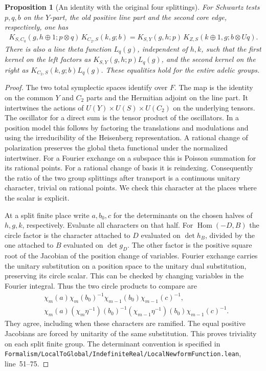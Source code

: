 \documentclass[a4paper,11pt]{article}
\newtheorem{proposition}{Proposition}[section]
\theoremstyle{definition}
\theoremstyle{remark}
\newcommand{\srcloc}[2]{{\small\nolinkurl{#1.lean}}, line~#2}
\numberwithin{equation}{section}
\begin{document}
\begin{proposition}[An identity with the original four splittings]\leavevmode
\label{prop:cancelsquare256}
For Schwartz tests \(p,q,b\) on the \(Y\)-part, the old positive
line part and the second core edge, respectively, one has
\[
\begin{split}
 K_{S,C_0}(g,h\oplus1;p\otimes q)\,K_{C_2,S}(k,g;b)
  =K_{S,Y}(g,h;p)\,K_{Z,S}(k\oplus1,g;b\otimes Uq).
\end{split}
\]
There is also a line theta function \(L_q(g)\), independent of
\(h,k\), such that the first kernel on the left factors as
\(K_{S,Y}(g,h;p)L_q(g)\), and the second kernel on the right
as \(K_{C_2,S}(k,g;b)L_q(g)\). These equalities hold for the
entire adelic groups.
\end{proposition}
\begin{proof}
The two total symplectic spaces identify over \(F\). The map is
the identity on the common \(Y\) and \(C_2\) parts and the
Hermitian adjoint on the line part. It intertwines the actions
of \(U(Y)\times U(S)\times U(C_2)\) on the underlying tensors.
The oscillator for a direct sum is the tensor product of the
oscillators. In a position model this follows by factoring the
translations and modulations and using the irreducibility of the
Heisenberg representation. A rational change of polarization
preserves the global theta functional under the normalized
intertwiner. For a Fourier exchange on a subspace this is
Poisson summation for its rational points. For a rational
change of basis it is reindexing. Consequently the ratio of
the two group splittings after transport is a continuous
unitary character, trivial on rational points. We check this
character at the places where the scalar is explicit.

At a split finite place write \(a,b_0,c\) for the determinants
on the chosen halves of \(h,g,k\), respectively. Evaluate all
characters on that half. For \(\operatorname{Hom}(-D,B)\)
the circle factor is the character attached to \(D\) evaluated
on \(\det h_B\), divided by the one attached to \(B\) evaluated
on \(\det g_D\). The other factor is the positive square root
of the Jacobian of the position change of variables. Fourier
exchange carries the unitary substitution on a position space
to the unitary dual substitution, preserving its circle scalar.
This can be checked by changing variables in the Fourier
integral. Thus the two circle products to compare are
\[
 \begin{aligned}
 &\chi_m(a)\chi_m(b_0)^{-1}
           \chi_{m-1}(b_0)\chi_{m-1}(c)^{-1},\\
 &\chi_m(a)(\chi_m\eta^{-1})(b_0)^{-1}
           (\chi_{m-1}\eta^{-1})(b_0)\chi_{m-1}(c)^{-1}.
 \end{aligned}
\]
They agree, including when these characters are ramified.
The equal positive Jacobians are forced by unitarity of the
same substitution. This proves triviality on each split finite
group. The determinant convention is specified in
\srcloc{Formalism/LocalToGlobal/IndefiniteReal/LocalNewformFunction}{51--75}.


\end{proof}
\end{document}
